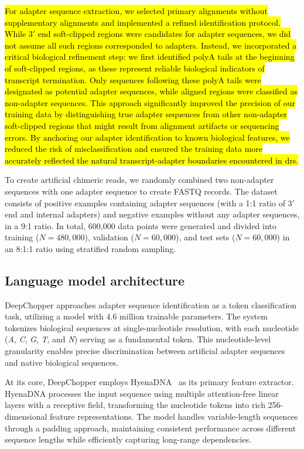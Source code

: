 \documentclass[pdflatex,sn-nature, lineno]{sn-jnl}%
\begin{document}
\hl{For adapter sequence extraction, we selected primary alignments without supplementary alignments and implemented a refined identification protocol. While $3'$ end soft-clipped regions were candidates for adapter sequences, we did not assume all such regions corresponded to adapters.
	Instead, we incorporated a critical biological refinement step: we first identified polyA tails at the beginning of soft-clipped regions, as these represent reliable biological indicators of transcript termination.
	Only sequences following these polyA tails were designated as potential adapter sequences, while aligned regions were classified as non-adapter sequences.
	This approach significantly improved the precision of our training data by distinguishing true adapter sequences from other non-adapter soft-clipped regions that might result from alignment artifacts or sequencing errors.
	By anchoring our adapter identification to known biological features, we reduced the risk of misclassification and ensured the training data more accurately reflected the natural transcript-adapter boundaries encountered in \mbox{\gls{drs}}.}

To create artificial chimeric reads, we randomly combined two non-adapter sequences with one adapter sequence to create FASTQ records.
The dataset consists of positive examples containing adapter sequences (with a 1:1 ratio of $3'$ end and internal adapters) and negative examples without any adapter sequences, in a 9:1 ratio.
In total, 600,000 data points were generated and divided into training ($N=480,000$), validation ($N=60,000$), and test sets ($N=60,000$) in an 8:1:1 ratio using stratified random sampling.

\subsection{Language model architecture}\label{ssec:lm}

DeepChopper approaches adapter sequence identification as a token classification task, utilizing a model with 4.6 million trainable parameters.
The system tokenizes biological sequences at single-nucleotide resolution, with each nucleotide (\emph{A}, \emph{C}, \emph{G}, \emph{T}, and \emph{N}) serving as a fundamental token.
This nucleotide-level granularity enables precise discrimination between artificial adapter sequences and native biological sequences.

At its core, DeepChopper employs HyenaDNA~\cite{nguyen2024hyenadna} as its primary feature extractor.
HyenaDNA processes the input sequence using multiple attention-free linear layers with a receptive field, transforming the nucleotide tokens into rich 256-dimensional feature representations.
The model handles variable-length sequences through a padding approach, maintaining consistent performance across different sequence lengths while efficiently capturing long-range dependencies.
\end{document}
